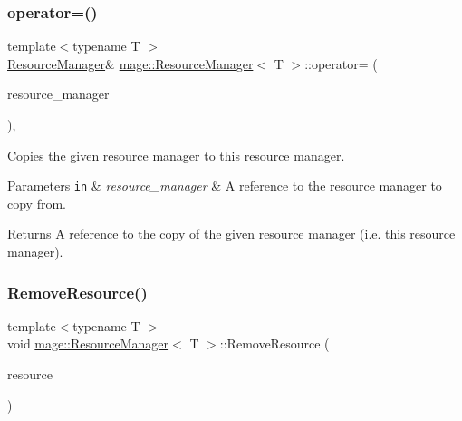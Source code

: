 \subsubsection{\texorpdfstring{operator=()}{operator=()}}
{\footnotesize\ttfamily template$<$typename T $>$ \\
\hyperlink{classmage_1_1_resource_manager}{Resource\+Manager}\& \hyperlink{classmage_1_1_resource_manager}{mage\+::\+Resource\+Manager}$<$ T $>$\+::operator= (\begin{DoxyParamCaption}\item[{const \hyperlink{classmage_1_1_resource_manager}{Resource\+Manager}$<$ T $>$ \&}]{resource\+\_\+manager }\end{DoxyParamCaption})\hspace{0.3cm}{\ttfamily [private]}, {\ttfamily [delete]}}

Copies the given resource manager to this resource manager.


\begin{DoxyParams}[1]{Parameters}
\mbox{\tt in}  & {\em resource\+\_\+manager} & A reference to the resource manager to copy from. \\
\hline
\end{DoxyParams}
\begin{DoxyReturn}{Returns}
A reference to the copy of the given resource manager (i.\+e. this resource manager). 
\end{DoxyReturn}
\hypertarget{classmage_1_1_resource_manager_ac557e5047590d0403291557c88966574}{}\label{classmage_1_1_resource_manager_ac557e5047590d0403291557c88966574} 
\subsubsection{\texorpdfstring{Remove\+Resource()}{RemoveResource()}\hspace{0.1cm}{\footnotesize\ttfamily [1/2]}}
{\footnotesize\ttfamily template$<$typename T $>$ \\
void \hyperlink{classmage_1_1_resource_manager}{mage\+::\+Resource\+Manager}$<$ T $>$\+::Remove\+Resource (\begin{DoxyParamCaption}\item[{\hyperlink{namespacemage_a1e01ae66713838a7a67d30e44c67703e}{Shared\+Ptr}$<$ T $>$}]{resource }\end{DoxyParamCaption})}

